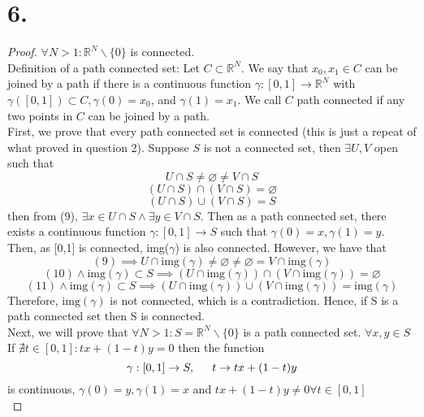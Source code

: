\documentclass[11pt]{article}
\begin{document}
\section*{6.}
\begin{proof} 
$\forall N>1: \mathbb{R}^N\backslash\{0\}$ is connected. \\
Definition of a path connected set:  Let $C \subset \mathbb{R}^N$. We say that $x_0, x_1 \in C$ can be joined by a path if there is a continuous function $\gamma : [0, 1] \to \mathbb{R}^N$ with $\gamma([0, 1]) \subset C, \gamma(0) = x_0$, and $\gamma(1) = x_1$. We call $C$ path connected if any two points in $C$ can be joined by a path. \\ 
First, we prove that every path connected set is connected (this is just a repeat of what proved in question 2). Suppose $S$ is not a connected set, 
then $\exists U,V$ open such that \\
\begin{equation} U \cap S \ne \varnothing \ne V \cap S\end{equation}
\begin{equation}(U \cap S) \cap (V \cap S) = \varnothing\end{equation}
\begin{equation}(U \cap S) \cup (V \cap S) = S\end{equation}
then from (9), $\exists x \in U \cap S \land \exists y \in V \cap S$. Then as a path connected set, there exists a continuous function $\gamma: [0,1] \to S$ such that $\gamma(0) = x, \gamma(1) = y$.\\
Then, as [0,1] is connected, img($\gamma$) is also connected. However, we have that 
\[
(9) \implies U \cap \text{img}(\gamma) \ne \varnothing \ne \varnothing = V \cap \text{img}(\gamma)
\]
\[
(10) \land \text{img}(\gamma) \subset S \implies (U \cap \text{img}(\gamma)) \cap (V \cap \text{img}(\gamma)) = \varnothing
\]
\[
(11) \land \text{img}(\gamma) \subset S \implies (U \cap \text{img}(\gamma))  \cup (V \cap \text{img}(\gamma)) = \text{img}(\gamma)
\]
Therefore, $\text{img}(\gamma)$ is not connected, which is a contradiction. Hence, if S is a path connected set then S is connected. \\
Next, we will prove that $\forall N>1: S = \mathbb{R}^N \backslash \{0\}$ is a path connected set.
$\forall x,y \in S$ \\
If $\nexists t \in [0,1]: tx+ (1-t)y = 0$ then the function
\[\gamma: [0,1] \to S, \indent t \to tx+(1-t)y \]
is continuous, $\gamma(0) = y, \gamma(1) = x$ and $tx+(1-t)y \ne 0 \forall t \in [0,1]$ \\

\end{proof}
\end{document}
